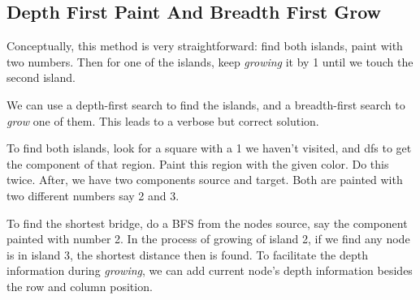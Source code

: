 \subsection{Depth First Paint And Breadth First Grow}
Conceptually, this method is very straightforward: find both islands, paint with two numbers. Then for one of the islands, keep \textit{growing} it by 1 until we touch the second island.
\par
We can use a depth-first search to find the islands, and a breadth-first search to \textit{grow} one of them. This leads to a verbose but correct solution.
\par
To find both islands, look for a square with a 1 we haven't visited, and dfs to get the component of that region. Paint this region with the given color. Do this twice. After, we have two components source and target. Both are painted with two different numbers say 2 and 3.
\par
To find the shortest bridge, do a BFS from the nodes source, say the component painted with number 2. In the process of growing of island 2, if we find any node is in island 3, the shortest distance then is found. To facilitate the depth information during \textit{growing}, we can add current node's depth information besides the row and column position.

